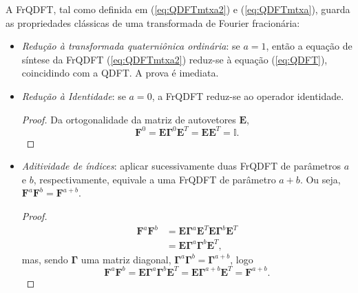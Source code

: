 A FrQDFT, tal como definida em (\ref{eq:QDFTmtxa2}) e (\ref{eq:QDFTmtxa}), guarda as propriedades cl\'assicas de uma transformada de Fourier fracion\'aria:
\begin{itemize}[noitemsep]
	\item \textit{Redu\c c\~ao \`a transformada quaterni\^onica ordin\'aria}: se $ a=1 $, ent\~ao a equa\c c\~ao de s\'intese da FrQDFT (\ref{eq:QDFTmtxa2}) reduz-se \`a equa\c c\~ao (\ref{eq:QDFT}), coincidindo com a QDFT. A prova \'e imediata.
	
	\item \textit{Redu\c c\~ao \`a Identidade}: se $ a=0 $, a FrQDFT reduz-se ao operador identidade.
	
	\begin{proof}
		Da ortogonalidade da matriz de autovetores $ \mathbf{E} $,
		\begin{equation}
		\mathbf{F}^0 = \mathbf{E} \boldsymbol{\Gamma}^0 \mathbf{E}^T = \mathbf{E} \mathbf{E}^T = \mathbb{I}.
		\end{equation}
	\end{proof}
	
	\item \textit{Aditividade de \'indices}: aplicar sucessivamente duas FrQDFT de par\^ametros $ a $ e $ b $, respectivamente, equivale a uma FrQDFT de par\^ametro $ a+b $. Ou seja, $ \mathbf{F}^a \mathbf{F}^b = \mathbf{F}^{a+b} $.
	
	\begin{proof}
		\begin{equation}
		\begin{aligned}
		\mathbf{F}^a \mathbf{F}^b &= \mathbf{E} \boldsymbol{\Gamma}^a \mathbf{E}^T
		\mathbf{E} \boldsymbol{\Gamma}^b \mathbf{E}^T \\
		&= \mathbf{E} \boldsymbol{\Gamma}^a \boldsymbol{\Gamma}^b \mathbf{E}^T,
		\end{aligned}
		\end{equation}
		mas, sendo $ \boldsymbol{\Gamma} $ uma matriz diagonal, $ \boldsymbol{\Gamma}^a \boldsymbol{\Gamma}^b =
		\boldsymbol{\Gamma}^{a+b} $, logo
		\begin{equation}
		\mathbf{F}^a \mathbf{F}^b = \mathbf{E} \boldsymbol{\Gamma}^a \boldsymbol{\Gamma}^b \mathbf{E}^T = \mathbf{E} \boldsymbol{\Gamma}^{a+b} \mathbf{E}^T =
		\mathbf{F}^{a+b}.
		\end{equation}
	\end{proof}
	

\end{itemize}
